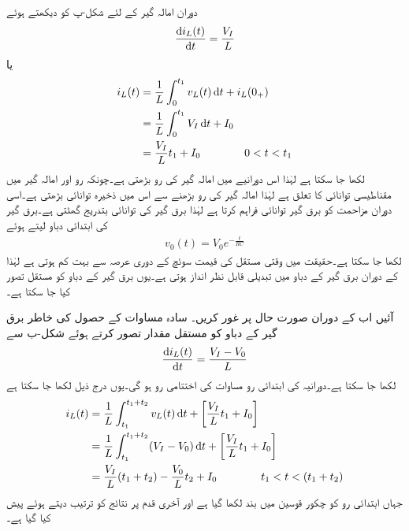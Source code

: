 دوران  امالہ گیر کے لئے  شکل-پ کو دیکھتے ہوئے 
\begin{align*}
\frac{\dif i_L(t)}{\dif t}=\frac{V_I}{L}
\end{align*}
یا
\begin{gather}
\begin{aligned}\label{مساوات_عارضی_بڑھاتا_منبع_دباو_الف}
i_L(t)&=\frac{1}{L} \int_{0}^{t_1} v_L(t) \dif t+i_L(0_+)\\
&=\frac{1}{L}\int_{0}^{t_1} V_I \dif t+I_0\\
&=\frac{V_I}{L} t_1+I_0\quad \quad \quad \quad 0<t<t_1
\end{aligned}
\end{gather}
لکھا جا سکتا ہے لہٰذا اس دورانیے میں امالہ گیر کی رو بڑھتی ہے۔چونکہ  رو اور امالہ گیر میں مقناطیسی توانائی کا تعلق  ہے لہٰذا امالہ گیر کی رو بڑھنے سے اس میں ذخیرہ توانائی بڑھتی ہے۔اسی دوران مزاحمت  کو برق گیر توانائی فراہم کرتا ہے لہٰذا برق گیر کی توانائی بتدریج گھٹتی ہے۔برق گیر کی ابتدائی دباو  لیتے ہوئے 
\begin{align*}
v_0(t)=V_0 e^{-\frac{t}{RC}}
\end{align*}
لکھا جا سکتا ہے۔حقیقت میں  وقتی مستقل کی قیمت سوئچ کے دوری عرصہ  سے  بہت کم  ہوتی ہے  لہٰذا  کے دوران برق گیر کے دباو میں تبدیلی قابل نظر انداز ہوتی ہے۔یوں برق گیر کے دباو کو مستقل تصور کیا جا سکتا ہے۔

آئیں اب  کے دوران صورت حال پر غور کریں۔ سادہ مساوات کے حصول کی خاطر برق گیر کے دباو کو مستقل مقدار  تصور کرتے  ہوئے شکل-ب  سے
\begin{align*}
\frac{\dif i_L(t)}{\dif t}=\frac{V_I-V_0}{L}
\end{align*}
لکھا جا سکتا ہے۔دورانیہ  کی ابتدائی رو مساوات  کی اختتامی رو ہو گی۔یوں درج ذیل لکھا جا سکتا ہے 
\begin{gather}
\begin{aligned}\label{مساوات_عارضی_بڑھاتا_منبع_دباو_ب}
i_L(t)&=\frac{1}{L}\int_{t_1}^{t_1+t_2} v_L(t) \dif t+\left[\frac{V_I}{L} t_1+I_0\right]\\
&=\frac{1}{L}\int_{t_1}^{t_1+t_2}(V_I-V_0)\dif t+\left[\frac{V_I}{L} t_1+I_0\right]\\
&=\frac{V_I}{L}(t_1+t_2)-\frac{V_0}{L}t_2+I_0 \quad \quad \quad \quad t_1<t<(t_1+t_2)
\end{aligned}
\end{gather}
جہاں ابتدائی رو کو چکور قوسین میں بند لکھا گیا ہے اور آخری قدم پر نتائج کو ترتیب دیتے ہوئے پیش کیا گیا ہے۔

